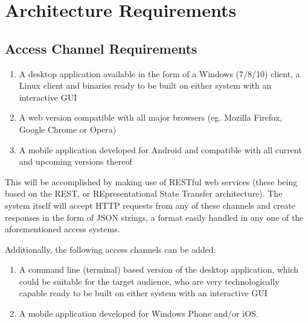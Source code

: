 \documentclass[hidelinks,a4paper,12pt]{article}
\begin{document}
	\section{Architecture Requirements}
	\subsection{Access Channel Requirements}
	\begin{enumerate}
		\item A desktop application available in the form of a Windows (7/8/10) client, a Linux client and binaries
		ready to be built on either system with an interactive GUI
		\item A web version compatible with all major browsers (eg. Mozilla Firefox, Google Chrome or Opera)
		\item A mobile application developed for Android and compatible with all current and upcoming versions thereof
	\end{enumerate}
	
	\begin{flushleft}
		This will be accomplished by making use of RESTful web services (these being based on the REST, or REpresentational State Transfer architecture). The system itself will accept HTTP requests from any of these channels
	and create responses in the form of JSON strings, a format easily handled in any one of the aforementioned access
	systems.
	
	Additionally, the following access channels can be added:
	\end{flushleft}
	
	\begin{enumerate}
		\item A command line (terminal) based version of the desktop application, which could be suitable for the target
		audience, who are very technologically capable
		ready to be built on either system with an interactive GUI
		\item A mobile application developed for Windows Phone and/or iOS.
	\end{enumerate}
	
\end{document}
